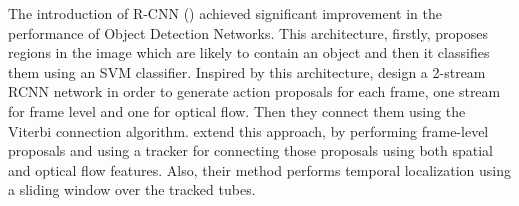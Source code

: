 The introduction of R-CNN (\cite{DBLP:journals/corr/GirshickDDM13}) achieved significant improvement
in the performance of Object Detection Networks. This architecture, firstly, proposes regions in the image which are likely to
contain an object and then it classifies them using an SVM classifier. Inspired by this architecture, \cite{DBLP:journals/corr/GkioxariM14}
design a 2-stream RCNN network in order to generate action proposals for each frame, one stream for frame level and one for optical flow.
Then they  connect them using the Viterbi connection algorithm. \cite{DBLP:journals/corr/WeinzaepfelHS15} extend this approach, by performing
frame-level proposals and using a tracker for connecting those proposals using both spatial and optical flow features. Also, their method performs
temporal localization using a sliding window over the tracked tubes.

